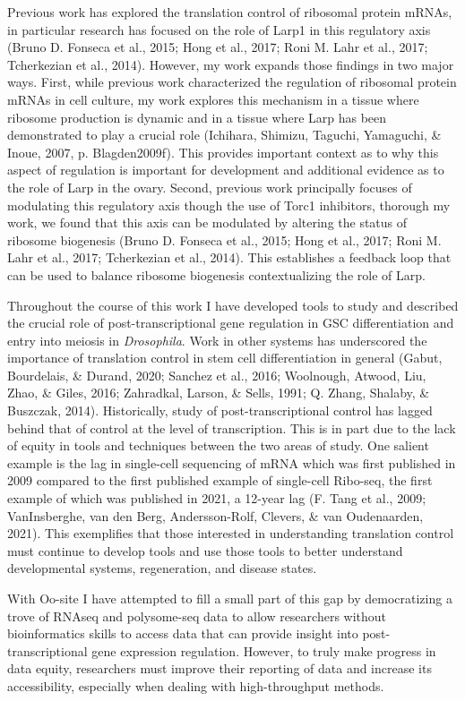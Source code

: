 \documentclass[12pt,oneside]{reedthesis}
\begin{document}
Previous work has explored the translation control of ribosomal protein mRNAs, in particular research has focused on the role of Larp1 in this regulatory axis (Bruno D. Fonseca et al., 2015; Hong et al., 2017; Roni M. Lahr et al., 2017; Tcherkezian et al., 2014). However, my work expands those findings in two major ways. First, while previous work characterized the regulation of ribosomal protein mRNAs in cell culture, my work explores this mechanism in a tissue where ribosome production is dynamic and in a tissue where Larp has been demonstrated to play a crucial role (Ichihara, Shimizu, Taguchi, Yamaguchi, \& Inoue, 2007, p. Blagden2009f). This provides important context as to why this aspect of regulation is important for development and additional evidence as to the role of Larp in the ovary. Second, previous work principally focuses of modulating this regulatory axis though the use of Torc1 inhibitors, thorough my work, we found that this axis can be modulated by altering the status of ribosome biogenesis (Bruno D. Fonseca et al., 2015; Hong et al., 2017; Roni M. Lahr et al., 2017; Tcherkezian et al., 2014). This establishes a feedback loop that can be used to balance ribosome biogenesis contextualizing the role of Larp.

Throughout the course of this work I have developed tools to study and described the crucial role of post-transcriptional gene regulation in GSC differentiation and entry into meiosis in \emph{Drosophila}. Work in other systems has underscored the importance of translation control in stem cell differentiation in general (Gabut, Bourdelais, \& Durand, 2020; Sanchez et al., 2016; Woolnough, Atwood, Liu, Zhao, \& Giles, 2016; Zahradkal, Larson, \& Sells, 1991; Q. Zhang, Shalaby, \& Buszczak, 2014). Historically, study of post-transcriptional control has lagged behind that of control at the level of transcription. This is in part due to the lack of equity in tools and techniques between the two areas of study. One salient example is the lag in single-cell sequencing of mRNA which was first published in 2009 compared to the first published example of single-cell Ribo-seq, the first example of which was published in 2021, a 12-year lag (F. Tang et al., 2009; VanInsberghe, van den Berg, Andersson-Rolf, Clevers, \& van Oudenaarden, 2021). This exemplifies that those interested in understanding translation control must continue to develop tools and use those tools to better understand developmental systems, regeneration, and disease states.

With Oo-site I have attempted to fill a small part of this gap by democratizing a trove of RNAseq and polysome-seq data to allow researchers without bioinformatics skills to access data that can provide insight into post-transcriptional gene expression regulation. However, to truly make progress in data equity, researchers must improve their reporting of data and increase its accessibility, especially when dealing with high-throughput methods.
\end{document}
